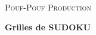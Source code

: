 \documentclass{article}
\begin{document}
\begin{titlepage}
	\centering
	{\scshape\LARGE Pouf-Pouf Production \par}
	\vspace{1.5cm}
	{\huge\bfseries Grilles de SUDOKU\par}
	\vfill
\end{titlepage}






\end{document}
